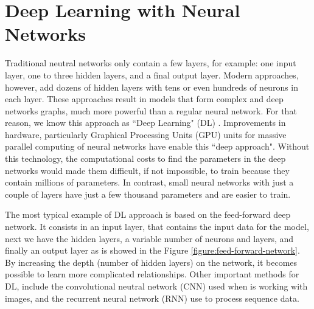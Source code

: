 \documentclass[12pt]{report}
\begin{document}
\section{Deep Learning with Neural Networks}

%

Traditional neutral networks only contain a few layers, for example: one input layer, one to three hidden layers, and a final output layer. 
Modern approaches,
however, add dozens of hidden layers with tens or even hundreds of neurons in each layer. These approaches result in models that
form complex and deep networks graphs, much more powerful  than a regular neural network. For that reason,  we know this approach as ``Deep Learning" (DL) \cite{Chandra2017} \cite{Goodfellow2016} \cite{Nevala2017}. Improvements in hardware, particularly Graphical Processing Units (GPU) units for massive parallel computing of neural networks have enable this ``deep approach". Without this technology, the computational costs to find the parameters in the deep networks would made them difficult, if not impossible, to train because they contain millions of parameters. In contrast, small 
neural networks with just a couple of layers have just a few thousand parameters and are easier to train. 

The most typical example of \ac{DL} approach is based on the feed-forward deep network. It consists in an input layer, that contains the input data for the model, next we have the hidden layers, a variable number of neurons and layers, and finally an output layer as is showed in the Figure \ref{figure:feed-forward-network}. By increasing the depth (number of hidden layers) on the network, it becomes possible to learn more complicated relationships. 
Other important methods for  \ac{DL}, include the convolutional neutral network (\ac{CNN}) used  when is working with images,  and the 
recurrent neural network (\ac{RNN})  use to process sequence data. 
\end{document}
